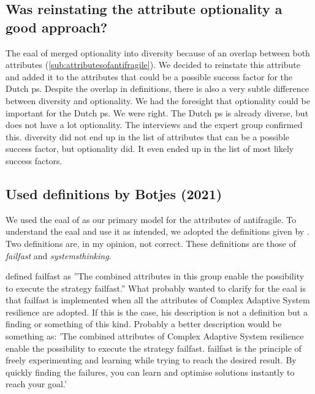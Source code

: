 \subsection{Was reinstating the attribute optionality a good approach?}
\label{sub:reinstating optionality}
The \acrlong{eaal} of \textcite{Botjes2021} merged \gls{optionality} into \gls{diversity} because of an overlap between both \glspl{attribute} (\cref{sub:attributesofantifragile}). We decided to reinstate this attribute and added it to the attributes that could be a possible success factor for the Dutch \gls{ps}. Despite the overlap in definitions, there is also a very subtle difference between \gls{diversity} and \gls{optionality}. We had the foresight that \gls{optionality} could be important for the Dutch \gls{ps}. We were right. The Dutch \gls{ps} is already diverse, but does not have a lot optionality. The interviews and the expert group confirmed this. \Gls{diversity} did not end up in the list of \glspl{attribute} that can be a possible success factor, but \gls{optionality} did. It even ended up in the list of most likely success factors.

\subsection{Used definitions by Botjes (2021)}
\label{sub:systemsthinkingdiscussion}
We used the \acrlong{eaal} of \textcite{Botjes2021} as our primary model for the \glspl{attribute} of \gls{antifragile}. To understand the \acrlong{eaal} and use it as intended, we adopted the definitions given by \textcite{Botjes2021}. Two definitions are, in my opinion, not correct. These definitions are those of \textit{\gls{failfast}} and \textit{\gls{systemsthinking}}.

\Textcite[p.~10]{Botjes2021} defined \gls{failfast} as ''The combined attributes in this group enable the possibility to execute the strategy \gls{failfast}.'' What \textcite{Botjes2021} probably wanted to clarify for the \acrlong{eaal} is that \gls{failfast} is implemented when all the \glspl{attribute} of Complex Adaptive System resilience are adopted. If this is the case, his description is not a definition but a finding or something of this kind. Probably a better description would be something as: 'The combined attributes of Complex Adaptive System resilience enable the possibility to execute the strategy \gls{failfast}. \Gls{failfast} is the principle of freely experimenting and learning while trying to reach the desired result. By quickly finding the failures, you can learn and optimise solutions instantly to reach your goal.'

